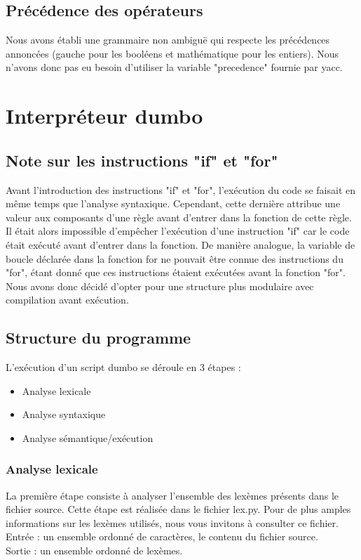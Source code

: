 \documentclass[10pt,a4paper]{article}
\begin{document}
	\subsection{Précédence des opérateurs}
	Nous avons établi une grammaire non ambiguë qui respecte les précédences annoncées (gauche pour les booléens et mathématique pour les entiers). Nous n'avons donc pas eu besoin d'utiliser la variable "precedence" fournie par yacc.
	
	\newpage
	\section{Interpréteur dumbo}
	
	\subsection{Note sur les instructions "if" et "for"}
	Avant l'introduction des instructions "if" et "for", l'exécution du code se faisait en même temps que l'analyse syntaxique.
	Cependant, cette dernière attribue une valeur aux composants d'une règle avant d'entrer dans la fonction de cette règle.
	Il était alors impossible d'empêcher l'exécution d'une instruction "if" car le code était exécuté avant d'entrer dans la fonction.
	De manière analogue, la variable de boucle déclarée dans la fonction for ne pouvait être connue des instructions du "for", étant donné que ces instructions étaient exécutées avant la fonction "for".
	Nous avons donc décidé d'opter pour une structure plus modulaire avec compilation avant exécution.
	
	\subsection{Structure du programme}
	
	L'exécution d'un script dumbo se déroule en 3 étapes :
	\begin{itemize}
		\item Analyse lexicale
		\item Analyse syntaxique
		\item Analyse sémantique/exécution
	\end{itemize}
	
	\subsubsection{Analyse lexicale}
	La première étape consiste à analyser l'ensemble des lexèmes présents dans le fichier source.
	Cette étape est réalisée dans le fichier lex.py. Pour de plus amples informations sur les lexèmes utilisés, nous vous invitons à consulter ce fichier.\\
	Entrée : un ensemble ordonné de caractères, le contenu du fichier source.\\
	Sortie : un ensemble ordonné de lexèmes.
	
\end{document}

